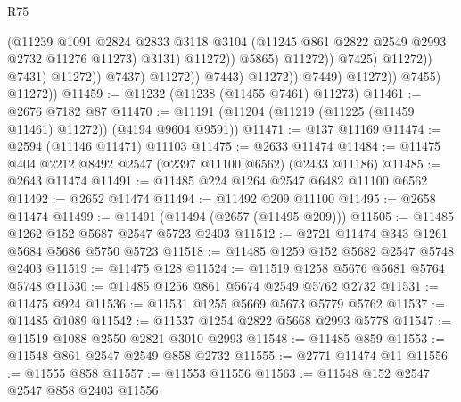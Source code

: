 \begin{lexlean}{R75}
\begin{coremodule}
                                                  (@11239
                                                    @1091
                                                    @2824
                                                    @2833
                                                    @3118
                                                    @3104
                                                    (@11245
                                                      @861
                                                      @2822
                                                      @2549
                                                      @2993
                                                      @2732
                                                      @11276
                                                      @11273)
                                                    @3131)
                                                  @11272))
                                              @5865)
                                            @11272))
                                        @7425)
                                      @11272))
                                  @7431)
                                @11272))
                            @7437)
                          @11272))
                      @7443)
                    @11272))
                @7449)
              @11272))
          @7455)
        @11272))
@11459 := @11232 (@11238 (@11455 @7461) @11273)
@11461 := @2676 @7182 @87
@11470 := @11191 (@11204 (@11219 (@11225 (@11459 @11461) @11272)) (@4194 @9604 @9591))
@11471 := @137 @11169
@11474 := @2594 (@11146 @11471) @11103
@11475 := @2633 @11474
@11484 := @11475 @404 @2212 @8492 @2547 (@2397 @11100 @6562) (@2433 @11186)
@11485 := @2643 @11474
@11491 := @11485 @224 @1264 @2547 @6482 @11100 @6562
@11492 := @2652 @11474
@11494 := @11492 @209 @11100
@11495 := @2658 @11474
@11499 := @11491 (@11494 (@2657 (@11495 @209)))
@11505 := @11485 @1262 @152 @5687 @2547 @5723 @2403
@11512 := @2721 @11474 @343 @1261 @5684 @5686 @5750 @5723
@11518 := @11485 @1259 @152 @5682 @2547 @5748 @2403
@11519 := @11475 @128
@11524 := @11519 @1258 @5676 @5681 @5764 @5748
@11530 := @11485 @1256 @861 @5674 @2549 @5762 @2732
@11531 := @11475 @924
@11536 := @11531 @1255 @5669 @5673 @5779 @5762
@11537 := @11485 @1089
@11542 := @11537 @1254 @2822 @5668 @2993 @5778
@11547 := @11519 @1088 @2550 @2821 @3010 @2993
@11548 := @11485 @859
@11553 := @11548 @861 @2547 @2549 @858 @2732
@11555 := @2771 @11474 @11
@11556 := @11555 @858
@11557 := @11553 @11556
@11563 := @11548 @152 @2547 @2547 @858 @2403 @11556

\end{coremodule}
\end{lexlean}
